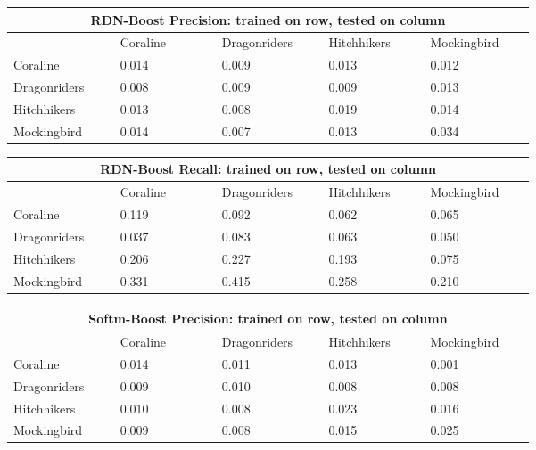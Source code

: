 \documentclass[letterpaper]{article}
\begin{document}
\begin{figure}[ht]
\centering

\begin{tabular}{|p{0.15\linewidth}|p{0.15\linewidth}|p{0.15\linewidth}|p{0.15\linewidth}|p{0.15\linewidth}|}
\hline
\multicolumn{5}{|c|}{\textbf{RDN-Boost Precision}: trained on row, tested on column}\\
\hline
    & Coraline & Dragonriders & Hitchhikers & Mockingbird \\
    \hline
     Coraline & 0.014 & 0.009 & 0.013 & 0.012 \\
     Dragonriders & 0.008 & 0.009 & 0.009 & 0.013 \\
     Hitchhikers & 0.013 & 0.008 & 0.019 & 0.014 \\
     Mockingbird & 0.014 & 0.007 & 0.013 & 0.034 \\
\hline
\end{tabular}

\begin{tabular}{|p{0.15\linewidth}|p{0.15\linewidth}|p{0.15\linewidth}|p{0.15\linewidth}|p{0.15\linewidth}|}
\hline
\multicolumn{5}{|c|}{\textbf{RDN-Boost Recall}: trained on row, tested on column}\\
\hline
    & Coraline & Dragonriders & Hitchhikers & Mockingbird\\
    \hline
    Coraline & 0.119 & 0.092 & 0.062 & 0.065 \\
    Dragonriders & 0.037 & 0.083 & 0.063 & 0.050 \\
    Hitchhikers & 0.206 & 0.227 & 0.193 & 0.075 \\
    Mockingbird & 0.331 & 0.415 & 0.258 & 0.210 \\
\hline
\end{tabular}

\begin{tabular}{|p{0.15\linewidth}|p{0.15\linewidth}|p{0.15\linewidth}|p{0.15\linewidth}|p{0.15\linewidth}|}
\hline
\multicolumn{5}{|c|}{\textbf{Softm-Boost Precision}: trained on row, tested on column}\\
\hline
    & Coraline & Dragonriders & Hitchhikers & Mockingbird \\
    \hline
     Coraline & 0.014 & 0.011 & 0.013 & 0.001 \\
     Dragonriders & 0.009 & 0.010 & 0.008 & 0.008 \\
     Hitchhikers & 0.010 & 0.008 & 0.023 & 0.016 \\
     Mockingbird & 0.009 & 0.008 & 0.015 & 0.025 \\
\hline
\end{tabular}


\end{figure}
\end{document}
